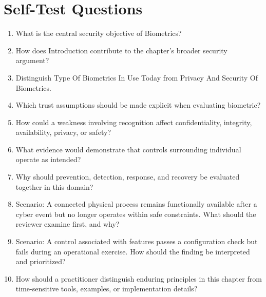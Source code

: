 \documentclass[11pt]{article}
\begin{document}
\section*{Self-Test Questions}
\begin{enumerate}
\item What is the central security objective of Biometrics?
\item How does Introduction contribute to the chapter's broader security argument?
\item Distinguish Type Of Biometrics In Use Today from Privacy And Security Of Biometrics.
\item Which trust assumptions should be made explicit when evaluating biometric?
\item How could a weakness involving recognition affect confidentiality, integrity, availability, privacy, or safety?
\item What evidence would demonstrate that controls surrounding individual operate as intended?
\item Why should prevention, detection, response, and recovery be evaluated together in this domain?
\item Scenario: A connected physical process remains functionally available after a cyber event but no longer operates within safe constraints. What should the reviewer examine first, and why?
\item Scenario: A control associated with features passes a configuration check but fails during an operational exercise. How should the finding be interpreted and prioritized?
\item How should a practitioner distinguish enduring principles in this chapter from time-sensitive tools, examples, or implementation details?
\end{enumerate}
\end{document}

